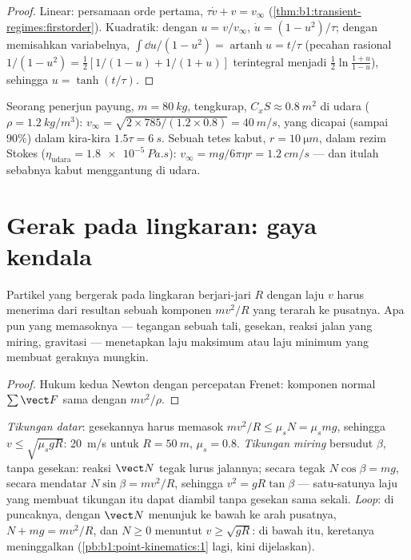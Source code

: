 \begin{proof}
Linear: persamaan orde pertama, $\tau\dot v + v = v_\infty$
(\cref{thm:b1:transient-regimes:firstorder}). Kuadratik: dengan
$u = v/v_\infty$, $\dot u = (1 - u^2)/\tau$; dengan memisahkan
variabelnya, $\int\dd u/(1 - u^2) = \operatorname{artanh}u = t/\tau$
(pecahan rasional $1/(1 - u^2) = \tfrac12[1/(1 - u) + 1/(1 + u)]$
terintegral menjadi $\tfrac12\ln\frac{1 + u}{1 - u}$), sehingga
$u = \tanh(t/\tau)$.
\end{proof}

\begin{example}\label{ex:b1:newton-dynamics:terminal}
Seorang penerjun payung, $m = \qty{80}{kg}$, tengkurap, $C_xS \approx \qty{0.8}{m^2}$
di udara ($\rho = \qty{1.2}{kg/m^3}$): $v_\infty = \sqrt{2 \times 785/(1.2
\times 0.8)} = \qty{40}{m/s}$, yang dicapai (sampai $90\%$) dalam kira-kira $1.5\tau =
\qty{6}{s}$. Sebuah tetes kabut, $r = \qty{10}{\micro m}$, dalam rezim
Stokes ($\eta_{\text{udara}} = \qty{1.8e-5}{Pa.s}$): $v_\infty = mg/6\pi\eta r =
\qty{1.2}{cm/s}$ --- dan itulah sebabnya kabut menggantung di udara.
\end{example}

\section{Gerak pada lingkaran: gaya kendala}

\begin{proposition}\label{prop:b1:newton-dynamics:centripetal}
Partikel yang bergerak pada lingkaran berjari-jari $R$ dengan laju $v$
harus menerima dari resultan  sebuah komponen $mv^2/R$ yang
terarah ke pusatnya. Apa pun yang memasoknya --- tegangan sebuah tali,
gesekan, reaksi jalan yang miring, gravitasi --- menetapkan laju
maksimum atau laju minimum yang membuat geraknya mungkin.
\end{proposition}

\begin{proof}
Hukum kedua Newton dengan percepatan Frenet: komponen normal
$\sum\vect F$ sama dengan $mv^2/\rho$.
\end{proof}

\begin{example}\label{ex:b1:newton-dynamics:circles}
\emph{Tikungan datar}: gesekannya harus memasok $mv^2/R \leq \mu_sN = \mu_smg$,
sehingga $v \leq \sqrt{\mu_sgR}$: \qty{20}{m/s} untuk $R = \qty{50}{m}$,
$\mu_s = 0.8$. \emph{Tikungan miring} bersudut $\beta$, tanpa gesekan:
reaksi $\vect N$ tegak lurus jalannya; secara tegak $N\cos\beta = mg$,
secara mendatar $N\sin\beta = mv^2/R$, sehingga $v^2 = gR\tan\beta$ ---
satu-satunya laju yang membuat tikungan itu dapat diambil tanpa gesekan
sama sekali. \emph{Loop}: di puncaknya, dengan $\vect N$ menunjuk ke
bawah ke arah pusatnya, $N + mg =
mv^2/R$, dan $N \geq 0$ menuntut $v \geq \sqrt{gR}$: di bawah itu,
keretanya meninggalkan  (\cref{pb:b1:point-kinematics:1}
lagi, kini dijelaskan).
\end{example}

